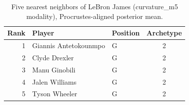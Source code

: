 \begin{table}[htbp]
  \centering\small
  \begin{tabular}{rllc}
    \toprule
    Rank & Player & Position & Archetype \\
    \midrule
    1 & Giannis Antetokounmpo & G & 2 \\
    2 & Clyde Drexler & G & 2 \\
    3 & Manu Ginobili & G & 2 \\
    4 & Jalen Williams & G & 2 \\
    5 & Tyson Wheeler & G & 2 \\
    \bottomrule
  \end{tabular}
  \caption{Five nearest neighbors of LeBron James (curvature_m5 modality), Procrustes-aligned posterior mean.}
  \label{tab:LeBron_James_neighbors_curvature_m5}
\end{table}

